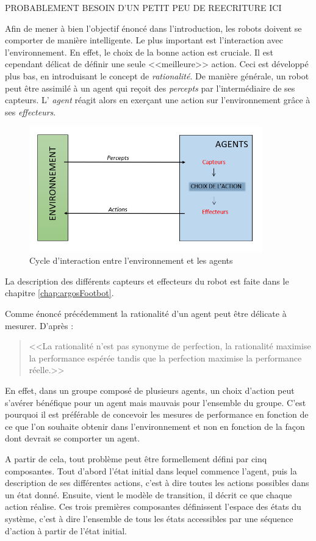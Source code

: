 PROBABLEMENT BESOIN D'UN PETIT PEU DE REECRITURE ICI

Afin de mener à bien l'objectif énoncé dans l'introduction, les robots doivent se comporter de manière intelligente. Le plus important est l'interaction avec l'environnement. En effet, le choix de la bonne action est cruciale. Il est cependant délicat de définir une seule <<meilleure>> action. Ceci est développé plus bas, en introduisant le concept de \emph{rationalité}.
De manière générale, un robot peut être assimilé à un agent qui reçoit des \emph{percepts} par l'intermédiaire de ses capteurs. L' \emph{agent} réagit alors en exerçant une action sur l'environnement grâce à ses \emph{effecteurs}.
\begin{figure}[htb]
  \centering
  \includegraphics[width=0.9\textwidth]{pics/cycleInteractionAI.png}
    \caption{Cycle d'interaction entre l'environnement et les agents}
\end{figure}
La description des différents capteurs et effecteurs du robot est faite dans le chapitre \ref{chap:argosFootbot}.

Comme énoncé précédemment la rationalité d'un agent peut être délicate à mesurer. D'après \cite{AIBrique}:
\begin{quote}
  <<La rationalité n'est pas synonyme de perfection, la rationalité maximise la performance espérée tandis que la perfection maximise la performance réelle.>>
\end{quote}


En effet, dans un groupe composé de plusieurs agents, un choix d'action peut s'avérer bénéfique pour un agent mais mauvais pour l'ensemble du groupe. C'est pourquoi il est préférable de concevoir les mesures de performance en fonction de ce que l'on souhaite obtenir dans l'environnement et non en fonction de la façon dont devrait se comporter un agent.

A partir de cela, tout problème peut être formellement défini par cinq composantes. Tout d'abord l'état initial dans lequel commence l'agent, puis la description de ses différentes actions, c'est à dire toutes les actions possibles dans un état donné. Ensuite, vient le modèle de transition, il décrit ce que chaque action réalise. Ces trois premières composantes définissent l'espace des états du système, c'est à dire l'ensemble de tous les états accessibles par une séquence d'action à partir de l'état initial.


